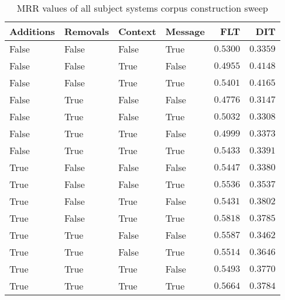 
\begin{table}
\begin{spacing}{1.2}
\centering
\caption{MRR values of all subject systems corpus construction sweep}
\label{table:all_corpus_sweep}
\vspace{0.2em}
\begin{tabular}{llll|rr}
\toprule
Additions & Removals & Context & Message &           FLT &           DIT \\
\midrule
    False &    False &   False &    True &      $0.5300$ &      $0.3359$ \\
    False &    False &    True &   False &      $0.4955$ &      $0.4148$ \\
    False &    False &    True &    True &      $0.5401$ & $\bm{0.4165}$ \\
    False &     True &   False &   False &      $0.4776$ &      $0.3147$ \\
    False &     True &   False &    True &      $0.5032$ &      $0.3308$ \\
    False &     True &    True &   False &      $0.4999$ &      $0.3373$ \\
    False &     True &    True &    True &      $0.5433$ &      $0.3391$ \\
     True &    False &   False &   False &      $0.5447$ &      $0.3380$ \\
     True &    False &   False &    True &      $0.5536$ &      $0.3537$ \\
     True &    False &    True &   False &      $0.5431$ &      $0.3802$ \\
     True &    False &    True &    True & $\bm{0.5818}$ &      $0.3785$ \\
     True &     True &   False &   False &      $0.5587$ &      $0.3462$ \\
     True &     True &   False &    True &      $0.5514$ &      $0.3646$ \\
     True &     True &    True &   False &      $0.5493$ &      $0.3770$ \\
     True &     True &    True &    True &      $0.5664$ &      $0.3784$ \\
\bottomrule
\end{tabular}

\end{spacing}
\end{table}
